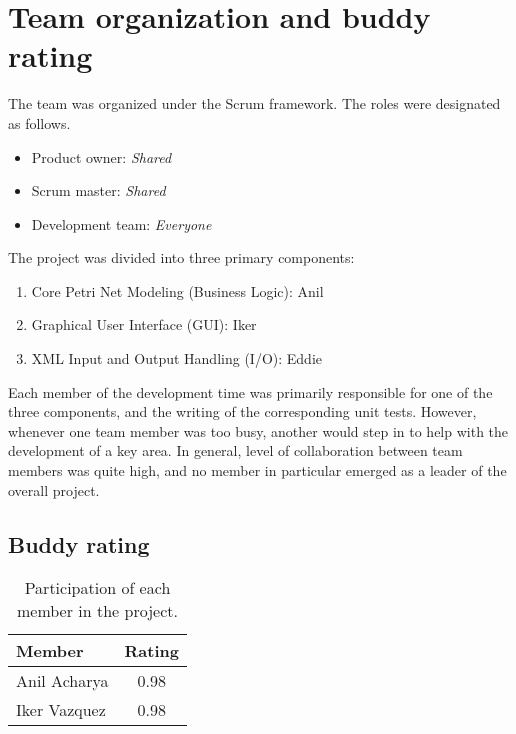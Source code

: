 
\section{Team organization and buddy rating}

The team was organized under the Scrum framework. The roles were designated as follows.

\begin{itemize}
\item Product owner: \textit{Shared}
\item Scrum master: \textit{Shared}
\item Development team: \textit{Everyone}
\end{itemize}

The project was divided into three primary components:

\begin{enumerate}
\item Core Petri Net Modeling (Business Logic): Anil
\item Graphical User Interface (GUI): Iker
\item XML Input and Output Handling (I/O): Eddie
\end{enumerate}

Each member of the development time was primarily responsible for one of the three components, and the writing of the corresponding unit tests. However,
whenever one team member was too busy, another would step in to help with the
development of a key area. In general, level of collaboration between team
members was quite high, and no member in particular emerged as a leader of the
overall project.

\subsection{Buddy rating}

\begin{table}[H]
\centering
\begin{tabular}{|l|c|}
\hline
\bf{Member} & \bf{Rating} \\
\hline
Anil Acharya & 0.98 \\
Iker Vazquez & 0.98 \\
\hline
\end{tabular}
\caption{Participation of each member in the project.}
\end{table}